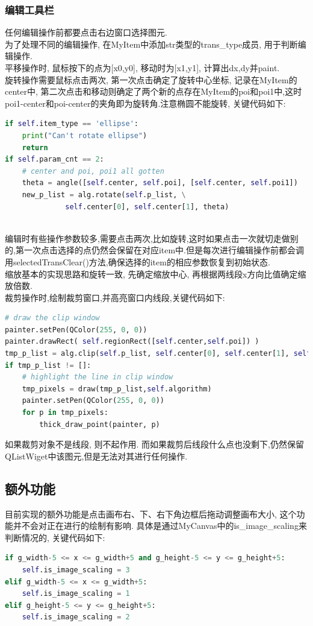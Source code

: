 \documentclass[a4paper,UTF8]{article}
\theoremstyle{definition}
\begin{document}
\subsubsection{编辑工具栏}
\indent 任何编辑操作前都要点击右边窗口选择图元.\\
\indent 为了处理不同的编辑操作, 在MyItem中添加str类型的trans\_type成员, 用于判断编辑操作.\\
\indent 平移操作时, 鼠标按下的点为[x0,y0], 移动时为[x1,y1], 计算出dx,dy并paint.\\
\indent 旋转操作需要鼠标点击两次, 第一次点击确定了旋转中心坐标, 记录在MyItem的center中, 第二次点击和移动则确定了两个新的点存在MyItem的poi和poi1中,这时poi1-center和poi-center的夹角即为旋转角.注意椭圆不能旋转, 关键代码如下:\\
\begin{lstlisting}[language={python}]
if self.item_type == 'ellipse':
    print("Can't rotate ellipse")
    return 
if self.param_cnt == 2:
    # center and poi, poi1 all gotten
    theta = angle([self.center, self.poi], [self.center, self.poi1])
    new_p_list = alg.rotate(self.p_list, \
              self.center[0], self.center[1], theta)
\end{lstlisting}
\indent\\
\indent 编辑时有些操作参数较多,需要点击两次,比如旋转,这时如果点击一次就切走做别的,第一次点击选择的点仍然会保留在对应item中.但是每次进行编辑操作前都会调用selectedTransClear()方法,确保选择的item的相应参数恢复到初始状态.\\
\indent 缩放基本的实现思路和旋转一致, 先确定缩放中心, 再根据两线段x方向比值确定缩放倍数.\\
\indent 裁剪操作时,绘制裁剪窗口,并高亮窗口内线段,关键代码如下: \\
\begin{lstlisting}[language={python}]
# draw the clip window
painter.setPen(QColor(255, 0, 0))
painter.drawRect( self.regionRect([self.center,self.poi]) )                 
tmp_p_list = alg.clip(self.p_list, self.center[0], self.center[1], self.poi[0], self.poi[1], self.trans_algorithm)
if tmp_p_list != []:
    # highlight the line in clip window
    tmp_pixels = draw(tmp_p_list,self.algorithm)
    painter.setPen(QColor(255, 0, 0))
    for p in tmp_pixels:
        thick_draw_point(painter, p)
\end{lstlisting}
\indent 如果裁剪对象不是线段, 则不起作用. 而如果裁剪后线段什么点也没剩下,仍然保留QListWiget中该图元,但是无法对其进行任何操作.
\subsection{额外功能}
目前实现的额外功能是点击画布右、下、右下角边框后拖动调整画布大小, 这个功能并不会对正在进行的绘制有影响. 具体是通过MyCanvas中的is\_image\_scaling来判断情况的, 关键代码如下:\\
\begin{lstlisting}[language={python}]
if g_width-5 <= x <= g_width+5 and g_height-5 <= y <= g_height+5:
    self.is_image_scaling = 3  
elif g_width-5 <= x <= g_width+5:  
    self.is_image_scaling = 1  
elif g_height-5 <= y <= g_height+5:  
    self.is_image_scaling = 2
\end{lstlisting}
\end{document}
